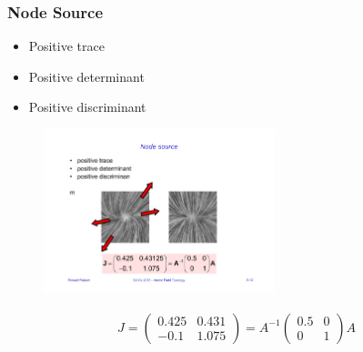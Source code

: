 \subsubsection{Node Source}
\begin{itemize}
    \item Positive trace
    \item Positive determinant
    \item Positive discriminant
\end{itemize}
\begin{figure}[H]
    \centering
    \includegraphics[width=0.6\textwidth,page=1]{img/08_2d_critical_points}
\end{figure}
\begin{align*}
J = \begin{pmatrix}
     0.425 & 0.431\\
     -0.1 & 1.075
 \end{pmatrix}
 = A ^{-1} 
     \begin{pmatrix}
         0.5 & 0\\
         0 & 1
     \end{pmatrix}A
\end{align*}

